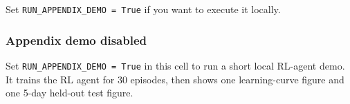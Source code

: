 \documentclass[11pt]{article}
\begin{document}
Set \texttt{RUN\_APPENDIX\_DEMO\ =\ True} if you want to execute it
locally.

    \subsubsection{Appendix demo disabled}\label{appendix-demo-disabled}

Set \texttt{RUN\_APPENDIX\_DEMO\ =\ True} in this cell to run a short
local RL-agent demo. It trains the RL agent for 30 episodes, then shows
one learning-curve figure and one 5-day held-out test figure.

    

    
    
    
\end{document}
